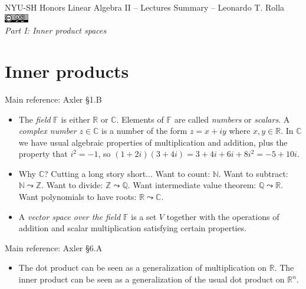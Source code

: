 \documentclass[11pt]{article}
\newcommand{\1}{\mathbf{1}}
\newcommand{\0}{\mathbf{0}}
\newcommand{\C}{\mathbb{C}}
\newcommand{\F}{\mathbb{F}}
\newcommand{\R}{\mathbb{R}}
\newcommand{\N}{\mathbb{N}}
\newcommand{\Q}{\mathbb{Q}}
\newcommand{\Z}{\mathbb{Z}}
\begin{document}
{NYU-SH Honors Linear Algebra II -- Lectures Summary \hfill -- \hfill Leonardo T. Rolla \href{http://creativecommons.org/licenses/by-sa/3.0/}{\includegraphics[height=1.0em]{by-sa.pdf}}
\\

\hfil
\emph{\Large Part I: Inner product spaces}


\section{Inner products}

Main reference:
Axler \S1.B

\begin{itemize}

\item

The \emph{field} $\F$ is either $\R$ or $\C$.
Elements of $\F$ are called \emph{numbers} or \emph{scalars}.
A \emph{complex number} $z \in \C$ is a number of the form $z = x+iy$ where $x,y\in \R$.
In $\C$ we have usual algebraic properties of multiplication and addition, plus the property that $i^2=-1$, so $(1+2i)(3+4i)=3+4i+6i+8i^2=-5+10i$.

\item

Why $\C$?
Cutting a long story short...
Want to count: $\N$.
Want to subtract: $\N \leadsto \Z$.
Want to divide: $\Z \leadsto \Q$.
Want intermediate value theorem: $\Q \leadsto \R$.
Want polynomials to have roots: $\R \leadsto \C$.

\item

A \emph{vector space over the field $\F$} is a set $V$ together with the operations of addition and scalar multiplication satisfying certain properties.

\end{itemize}

Main reference:
Axler \S6.A

\begin{itemize}

\item

The dot product can be seen as a generalization of multiplication on $\R$.
The inner product can be seen as a generalization of the usual dot product on $\R^n$.


\end{itemize}}
\end{document}
